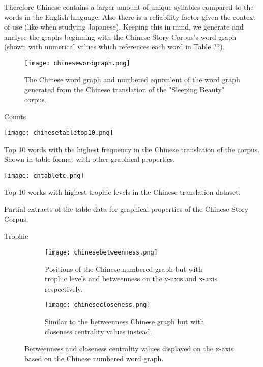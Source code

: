 Therefore Chinese contains a larger amount of unique syllables compared to the words in the English language. Also there is a reliability factor given the context of use (like when studying Japanese). Keeping this in mind, we generate and analyse the graphs beginning with the Chinese Story Corpus's word graph (shown with numerical values which references each word in Table ??).

\begin{figure}[H]
\centering
\texttt{[image: chinesewordgraph.png]}
\caption{The Chinese word graph and numbered equivalent of the word graph generated from the Chinese translation of the "Sleeping Beauty" corpus.}
\label{fig:cngraph}
\end{figure}

Counts

\begin{table}[H]
\centering
\begin{subtable}{.45\textwidth}
	\texttt{[image: chinesetabletop10.png]}
	\caption{Top 10 words with the highest frequency in the Chinese translation of the corpus. Shown in table format with other graphical properties. }
	\label{table:chinesetop}
\end{subtable}
\hfill
\begin{subtable}{.45\textwidth}
	\hspace{1.5cm} 
	\texttt{[image: cntabletc.png]}
	\caption{Top 10 works with highest trophic levels in the Chinese translation dataset.}
	\label{table:chinesetoptc}
\end{subtable}
\caption{Partial extracts of the table data for graphical properties of the Chinese Story Corpus.}
\end{table}

Trophic

\begin{figure}[H]
\centering
\begin{subfigure}{.45\textwidth}
	\hspace{-1cm} 
	\texttt{[image: chinesebetweenness.png]}
	\caption{Positions of the Chinese numbered graph but with trophic levels and betweenness on the y-axis and x-axis respectively.}
	\label{fig:cnbc}
\end{subfigure}
\hfill
\begin{subfigure}{.45\textwidth}
	\hspace{-1cm} 
	\texttt{[image: chinesecloseness.png]}
	\caption{Similar to the betweenness Chinese graph but with closeness centrality values instead. }
	\label{fig:cncc}
\end{subfigure}
\caption{Betweenness and closeness centrality values displayed on the x-axis based on the Chinese numbered word graph.}
\label{fig:cncentrality}
\end{figure}

